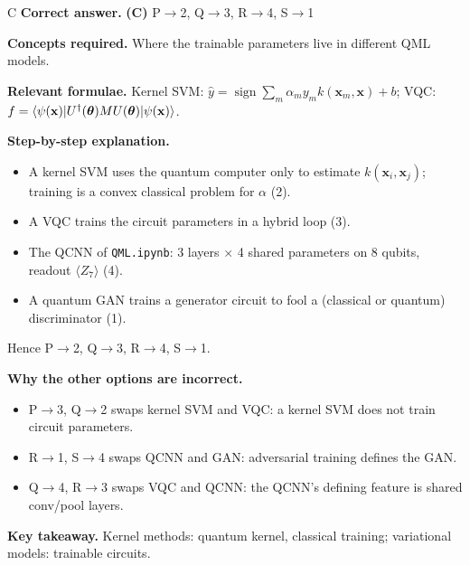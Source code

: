 \documentclass[11pt,a4paper]{article}
\newcommand{\qsep}{\par\vspace{2pt}{\color{black!15}\hrule}\vspace{4pt}}
\begin{document}
\begin{solbox}{C}
\textbf{\color{brand}Correct answer.} \textcolor{okgreen}{\textbf{(C)}} P$\to$2, Q$\to$3, R$\to$4, S$\to$1

\textbf{\color{brand}Concepts required.} Where the trainable parameters live in different QML models.

\textbf{\color{brand}Relevant formulae.} Kernel SVM: $\hat y = \operatorname{sign}\sum_m\alpha_my_mk(\mathbf x_m, \mathbf x) + b$; VQC: $f = \braket{\psi(\mathbf x)|U^\dagger(\boldsymbol\theta)MU(\boldsymbol\theta)|\psi(\mathbf x)}$.

\textbf{\color{brand}Step-by-step explanation.} \begin{itemize}\itemsep0pt
\item A kernel SVM uses the quantum computer only to estimate $k(\mathbf x_i, \mathbf x_j)$; training is a convex classical problem for $\alpha$ (2).
\item A VQC trains the circuit parameters in a hybrid loop (3).
\item The QCNN of \texttt{QML.ipynb}: 3 layers $\times$ 4 shared parameters on 8 qubits, readout $\langle Z_7\rangle$ (4).
\item A quantum GAN trains a generator circuit to fool a (classical or quantum) discriminator (1).
\end{itemize}
Hence P$\to$2, Q$\to$3, R$\to$4, S$\to$1.

\textbf{\color{brand}Why the other options are incorrect.}
\begin{itemize}[leftmargin=2.4em, itemsep=1pt, topsep=2pt]
\item[\textbf{(A)}] P$\to$3, Q$\to$2 swaps kernel SVM and VQC: a kernel SVM does not train circuit parameters.
\item[\textbf{(B)}] R$\to$1, S$\to$4 swaps QCNN and GAN: adversarial training defines the GAN.
\item[\textbf{(D)}] Q$\to$4, R$\to$3 swaps VQC and QCNN: the QCNN's defining feature is shared conv/pool layers.
\end{itemize}
\textbf{\color{brand}Key takeaway.} Kernel methods: quantum kernel, classical training; variational models: trainable circuits.
\end{solbox}
\qsep
\end{document}
